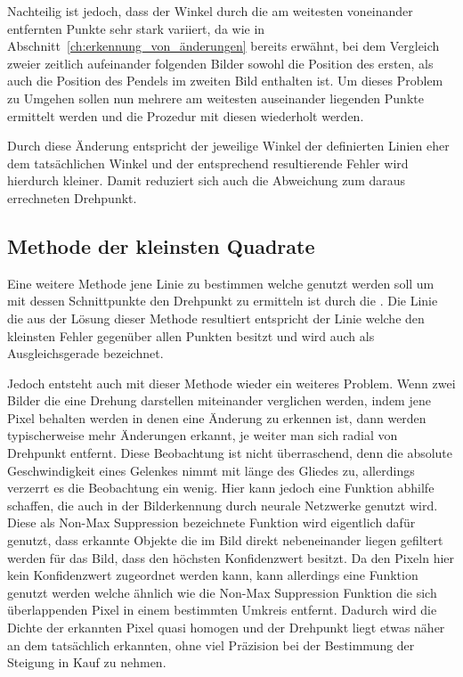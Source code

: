 
Nachteilig ist jedoch, dass der Winkel durch die am weitesten voneinander entfernten Punkte sehr stark variiert, da wie in Abschnitt~\ref{ch:erkennung_von_änderungen} bereits erwähnt, bei dem Vergleich zweier zeitlich aufeinander folgenden Bilder sowohl die Position des ersten, als auch die Position des Pendels im zweiten Bild enthalten ist.
Um dieses Problem zu Umgehen sollen nun mehrere am weitesten auseinander liegenden Punkte ermittelt werden und die Prozedur mit diesen wiederholt werden.

Durch diese Änderung entspricht der jeweilige Winkel der definierten Linien eher dem tatsächlichen Winkel und der entsprechend resultierende Fehler wird hierdurch kleiner.
Damit reduziert sich auch die Abweichung zum daraus errechneten Drehpunkt.

\subsection{Methode der kleinsten Quadrate}

Eine weitere Methode jene Linie zu bestimmen welche genutzt werden soll um mit dessen Schnittpunkte den Drehpunkt zu ermitteln ist durch die .
Die Linie die aus der Lösung dieser Methode resultiert entspricht der Linie welche den kleinsten Fehler gegenüber allen Punkten besitzt und wird auch als Ausgleichsgerade bezeichnet. %



Jedoch entsteht auch mit dieser Methode wieder ein weiteres Problem.
Wenn zwei Bilder die eine Drehung darstellen miteinander verglichen werden, indem jene Pixel behalten werden in denen eine Änderung zu erkennen ist, dann werden typischerweise mehr Änderungen erkannt, je weiter man sich radial von Drehpunkt entfernt.
Diese Beobachtung ist nicht überraschend, denn die absolute Geschwindigkeit eines Gelenkes nimmt mit länge des Gliedes zu, allerdings verzerrt es die Beobachtung ein wenig.
Hier kann jedoch eine Funktion abhilfe schaffen, die auch in der Bilderkennung durch neurale Netzwerke genutzt wird.
Diese als Non-Max Suppression %
bezeichnete Funktion wird eigentlich dafür genutzt, dass erkannte Objekte die im Bild direkt nebeneinander liegen gefiltert werden für das Bild, dass den höchsten Konfidenzwert besitzt.
Da den Pixeln hier kein Konfidenzwert zugeordnet werden kann, kann allerdings eine Funktion genutzt werden welche ähnlich wie die Non-Max Suppression Funktion %
die sich überlappenden Pixel in einem bestimmten Umkreis entfernt.
Dadurch wird die Dichte der erkannten Pixel quasi homogen und der Drehpunkt liegt etwas näher an dem tatsächlich erkannten, ohne viel Präzision bei der Bestimmung der Steigung in Kauf zu nehmen.

